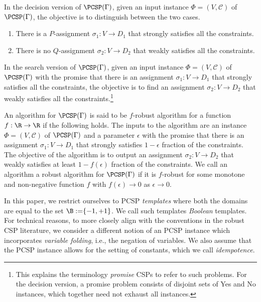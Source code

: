 \begin{definition}\label{def:pcsp-prob} In the decision version of $\PCSP(\Gamma)$, given an input instance $\Phi=(V,\mathcal{C})$ of $\PCSP(\Gamma)$, the objective is to distinguish between the two cases.
  \begin{enumerate}
\item  There is a $P$-assignment $\sigma_1 : V \rightarrow D_1$ that strongly satisfies all the constraints.
\item There is no $Q$-assignment $\sigma_2 : V \rightarrow D_2$ that weakly satisfies all the constraints.  
\end{enumerate}

In the search version of $\PCSP(\Gamma)$, given an input instance $\Phi=(V,\mathcal{C})$ of $\PCSP(\Gamma)$ with the promise that there is an assignment $\sigma_1: V\rightarrow D_1$ that strongly satisfies all the constraints, the objective is to find an assignment $\sigma_2: V \rightarrow D_2$ that weakly satisfies all the constraints.\footnote{{This explains the terminology \emph{promise} CSPs to refer to such problems. For the decision version, a promise problem consists of disjoint sets of Yes and No instances, which together need not exhaust all instances.}}
 
{An algorithm for $\PCSP(\Gamma)$ is said to be $f$-robust algorithm for a function $f:\R \rightarrow \R$ if the following holds. The inputs to the algorithm are an instance $\Phi=(V,\mathcal{C})$ of $\PCSP(\Gamma)$ and a parameter $\epsilon$} with the promise that there is an assignment $\sigma_1: V\rightarrow D_1$ that strongly satisfies $1-\epsilon$ fraction of the constraints. {The objective of the algorithm is to output an assignment} $\sigma_2: V \rightarrow D_2$ that weakly satisfies at least $1-f(\epsilon)$ fraction of the constraints. {We call an algorithm a robust algorithm for $\PCSP(\Gamma)$ if it is $f$-robust for some monotone and non-negative function $f$ with $f(\epsilon)\rightarrow 0$ as $\epsilon \rightarrow 0$.}
\end{definition}

In this paper, we restrict ourselves to PCSP \emph{templates} where both the domains are equal to the set ${\B :=} \{-1,+1\}$. {We call such templates \emph{Boolean} templates.} {For technical reasons, to more closely align with the conventions in the robust CSP literature, we consider a different notion of an PCSP instance which incorporates \emph{variable folding}, i.e., the negation of variables. We also assume that the PCSP instance allows for the setting of constants, which we call \emph{idempotence}.}

